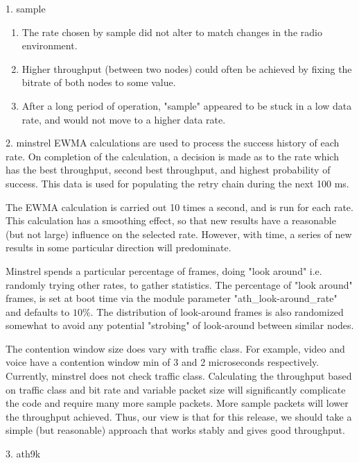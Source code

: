   1. sample
    \begin{enumerate}
      \item The rate chosen by sample did not alter to match changes in the radio
	    environment.
      \item Higher throughput (between two nodes) could often be achieved by fixing
	    the bitrate of both nodes to some value.
      \item After a long period of operation, "sample" appeared to be stuck in a low
	    data rate, and would not move to a higher data rate.
    \end{enumerate}

  2. minstrel
    EWMA calculations are used to process the success history of each rate. On
	completion of the calculation, a decision is made as to the rate which has the
	best throughput, second best throughput, and highest probability of success.
	This data is used for populating the retry chain during the next 100 ms.

    The EWMA calculation is carried out 10 times a second, and is run for each
	rate. This calculation has a smoothing effect, so that new results have a
	reasonable (but not large) influence on the selected rate. However, with time,
	a series of new results in some particular direction will predominate.

    Minstrel spends a particular percentage of frames, doing "look
	around" i.e. randomly trying other rates, to gather statistics. The percentage
	of "look around" frames, is set at boot time via the module parameter
	"ath\_look-around\_rate" and defaults to $10\%$. The distribution of look-around
	frames is also randomized somewhat to avoid any potential "strobing" of
	look-around between similar nodes.

    The contention window size does vary with traffic class. For example, video
	and voice have a contention window min of 3 and 2 microseconds
	respectively. Currently, minstrel does not check traffic class.	Calculating the throughput based on traffic class and bit rate and variable
	packet size will significantly complicate the code and require many more
	sample packets. More sample packets will lower the throughput achieved. Thus,
	our view is that for this release, we should take a simple (but reasonable)
	approach that works stably and gives good throughput.

  3. ath9k

